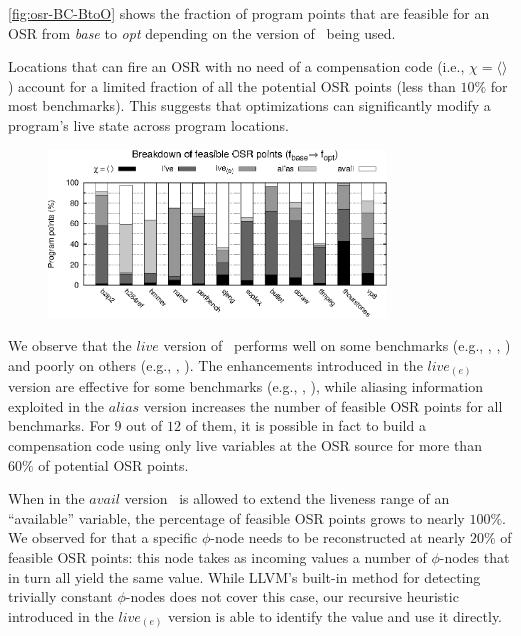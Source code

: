 \myfigure\ref{fig:osr-BC-BtoO} shows the fraction of program points that are feasible for an OSR from {\em base} to {\em opt} depending on the version of \reconstruct\ being used.

Locations that can fire an OSR with no need of a compensation code (i.e., $\chi=\langle\rangle$) account for a limited fraction of all the potential OSR points (less than $10\%$ for most benchmarks). This suggests that optimizations can significantly modify a program's live state across program locations.

\begin{figure}[!t]
\begin{center}
\includegraphics[width=0.8\textwidth]{figures/osr-BC-BtoO/osr-BC-BtoO.eps}
\caption{\protect}
\end{center}
\end{figure}

We observe that the $live$ version of \reconstruct\ performs well on some benchmarks (e.g., , , ) and poorly on others (e.g., , ). The enhancements introduced in the $live_{(e)}$ version are effective for some benchmarks (e.g., , ), while aliasing information exploited in the $alias$ version increases the number of feasible OSR points for all benchmarks. For $9$ out of $12$ of them, it is possible in fact to build a compensation code using only live variables at the OSR source for more than $60\%$ of potential OSR points. 

When in the $avail$ version \reconstruct\ is allowed to extend the liveness range of an ``available'' variable, the percentage of feasible OSR points grows to nearly $100\%$. We observed for  that a specific $\phi$-node needs to be reconstructed at nearly $20\%$ of feasible OSR points: this node takes as incoming values a number of $\phi$-nodes that in turn all yield the same value. While LLVM's built-in method for detecting trivially constant $\phi$-nodes does not cover this case, our recursive heuristic introduced in the $live_{(e)}$ version is able to identify the value and use it directly.

